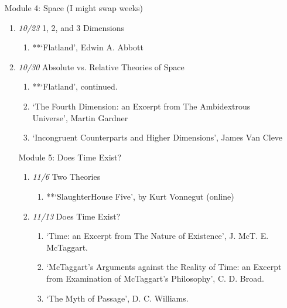 \documentclass[article,oneside]{memoir}
\begin{document}
\begin{description}
\begin{enumerate}
\begin{enumerate}
\item[Module 4:] Space (I might swap weeks)
\begin{enumerate}
\item \textit{10/23} 1, 2, and 3 Dimensions
\begin{enumerate}
\item **`Flatland', Edwin A. Abbott
\end{enumerate}

\item \textit{10/30} Absolute vs. Relative Theories of Space
\begin{enumerate}
\item **`Flatland', continued.
\item `The Fourth Dimension: an Excerpt from The Ambidextrous Universe', Martin Gardner
\item `Incongruent Counterparts and Higher Dimensions', James Van Cleve
\end{enumerate}



\item[Module 5:] Does Time Exist? 
\begin{enumerate}
\item \textit{11/6} Two Theories
\begin{enumerate}
\item **`SlaughterHouse Five', by Kurt Vonnegut (online)
\end{enumerate}
\item  \textit{11/13} Does Time Exist?
\begin{enumerate}
\item `Time: an Excerpt from The Nature of Existence', J. McT. E. McTaggart.
\item `McTaggart’s Arguments against the Reality of Time: an Excerpt from Examination of McTaggart’s Philosophy', C. D. Broad.
\item `The Myth of Passage', D. C. Williams.
\end{enumerate}



\end{enumerate}
\end{enumerate}
\end{enumerate}
\end{enumerate}
\end{description}
\end{document}
